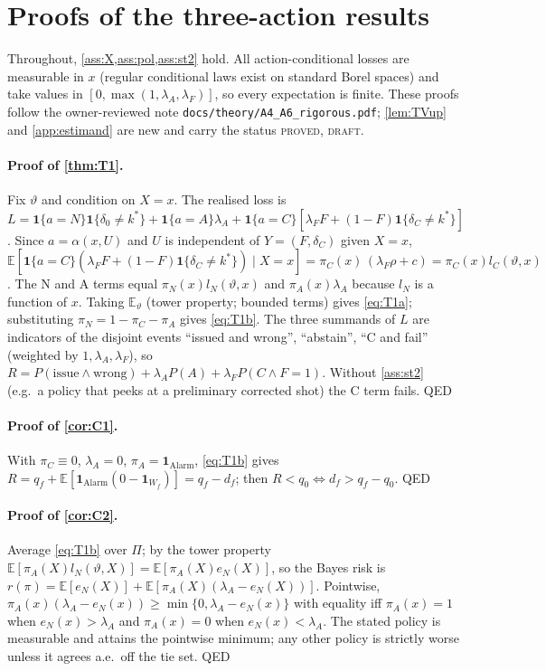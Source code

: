 \documentclass[10pt,twocolumn]{article}
\newcommand{\fn}[1]{{\small\nolinkurl{#1}}}
\theoremstyle{definition}
\theoremstyle{remark}
\renewcommand{\qedsymbol}{{\normalfont\small QED}}
\newcommand{\E}{\mathbb{E}}
\newcommand{\vt}{\vartheta}
\newcommand{\lA}{\lambda_A}
\newcommand{\lF}{\lambda_F}
\newcommand{\one}{\mathbf 1}
\begin{document}



\clearpage
\iftwocol\onecolumn\fi
\appendix

\section{Proofs of the three-action results}\label{app:theory}

Throughout, \cref{ass:X,ass:pol,ass:st2} hold. All action-conditional losses are measurable in $x$ (regular conditional laws exist on standard Borel spaces) and take values in $[0,\max(1,\lA,\lF)]$, so every expectation is finite. These proofs follow the owner-reviewed note \fn{docs/theory/A4_A6_rigorous.pdf}; \cref{lem:TVup} and \cref{app:estimand} are new and carry the status \textsc{proved, draft}.

\paragraph{Proof of \cref{thm:T1}.} Fix $\vt$ and condition on $X=x$. The realised loss is
$L=\one\{a=N\}\one\{\delta_0\neq k^*\}+\one\{a=A\}\lA+\one\{a=C\}[\lF F+(1-F)\one\{\delta_C\neq k^*\}]$.
Since $a=\alpha(x,U)$ and $U$ is independent of $Y=(F,\delta_C)$ given $X=x$,
$\E[\one\{a=C\}(\lF F+(1-F)\one\{\delta_C\neq k^*\})\mid X=x]=\pi_C(x)\,(\lF\rho+c)=\pi_C(x)l_C(\vt,x)$.
The N and A terms equal $\pi_N(x)l_N(\vt,x)$ and $\pi_A(x)\lA$ because $l_N$ is a function of $x$. Taking $\E_\vt$ (tower property; bounded terms) gives \eqref{eq:T1a}; substituting $\pi_N=1-\pi_C-\pi_A$ gives \eqref{eq:T1b}. The three summands of $L$ are indicators of the disjoint events ``issued and wrong'', ``abstain'', ``C and fail'' (weighted by $1,\lA,\lF$), so $R=P(\text{issue}\wedge\text{wrong})+\lA P(A)+\lF P(C\wedge F{=}1)$. Without \cref{ass:st2} (e.g.\ a policy that peeks at a preliminary corrected shot) the C term fails. \hfill\qedsymbol

\paragraph{Proof of \cref{cor:C1}.} With $\pi_C\equiv0$, $\lA=0$, $\pi_A=\one_{\mathrm{Alarm}}$, \eqref{eq:T1b} gives $R=q_f+\E[\one_{\mathrm{Alarm}}(0-\one_{W_f})]=q_f-d_f$; then $R<q_0\iff d_f>q_f-q_0$. \hfill\qedsymbol

\paragraph{Proof of \cref{cor:C2}.} Average \eqref{eq:T1b} over $\Pi$; by the tower property $\E[\pi_A(X)l_N(\vt,X)]=\E[\pi_A(X)e_N(X)]$, so the Bayes risk is $r(\pi)=\E[e_N(X)]+\E[\pi_A(X)(\lA-e_N(X))]$. Pointwise, $\pi_A(x)(\lA-e_N(x))\ge\min\{0,\lA-e_N(x)\}$ with equality iff $\pi_A(x)=1$ when $e_N(x)>\lA$ and $\pi_A(x)=0$ when $e_N(x)<\lA$. The stated policy is measurable and attains the pointwise minimum; any other policy is strictly worse unless it agrees a.e.\ off the tie set. \hfill\qedsymbol
\end{document}
